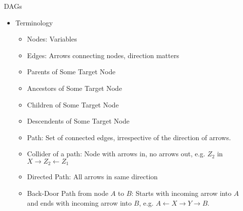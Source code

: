 \documentclass[12pt]{article}
\theoremstyle{plain}
\theoremstyle{definition}
\theoremstyle{remark}
\newcommand{\ra}{\rightarrow}
\begin{document}
\clearpage
DAGs
\begin{itemize}
  \item Terminology
    \begin{itemize}
      \item Nodes: Variables
      \item Edges: Arrows connecting nodes, direction matters
      \item Parents of Some Target Node
      \item Ancestors of Some Target Node
      \item Children of Some Target Node
      \item Descendents of Some Target Node
      \item Path: Set of connected edges, irrespective of the direction
        of arrows.
      \item Collider of a path:
        Node with arrows in, no arrows out, e.g.  $Z_2$ in
        $X \ra Z_2 \leftarrow Z_1$
      \item Directed Path: All arrows in same direction
      \item Back-Door Path from node $A$ to $B$:
        Starts with incoming arrow into $A$ and ends with incoming arrow
        into $B$, e.g.  $A \leftarrow X \ra Y \ra B$.


\end{itemize}
\end{itemize}
\end{document}
